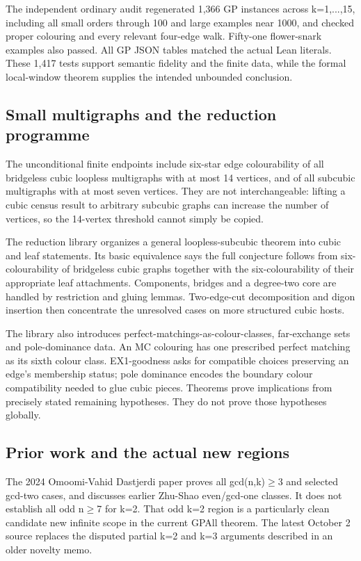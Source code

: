\documentclass[11pt,a4paper]{article}
\begin{document}
The independent ordinary audit regenerated 1,366 GP instances across k=1,...,15, including all small orders through 100 and large examples near 1000, and checked proper colouring and every relevant four-edge walk. Fifty-one flower-snark examples also passed. All GP JSON tables matched the actual Lean literals. These 1,417 tests support semantic fidelity and the finite data, while the formal local-window theorem supplies the intended unbounded conclusion.

\subsection{Small multigraphs and the reduction programme}
The unconditional finite endpoints include six-star edge colourability of all bridgeless cubic loopless multigraphs with at most 14 vertices, and of all subcubic multigraphs with at most seven vertices. They are not interchangeable: lifting a cubic census result to arbitrary subcubic graphs can increase the number of vertices, so the 14-vertex threshold cannot simply be copied.

The reduction library organizes a general loopless-subcubic theorem into cubic and leaf statements. Its basic equivalence says the full conjecture follows from six-colourability of bridgeless cubic graphs together with the six-colourability of their appropriate leaf attachments. Components, bridges and a degree-two core are handled by restriction and gluing lemmas. Two-edge-cut decomposition and digon insertion then concentrate the unresolved cases on more structured cubic hosts.

The library also introduces perfect-matchings-as-colour-classes, far-exchange sets and pole-dominance data. An MC colouring has one prescribed perfect matching as its sixth colour class. EX1-goodness asks for compatible choices preserving an edge's membership status; pole dominance encodes the boundary colour compatibility needed to glue cubic pieces. Theorems prove implications from precisely stated remaining hypotheses. They do not prove those hypotheses globally.

\subsection{Prior work and the actual new regions}
The 2024 Omoomi-Vahid Dastjerdi paper proves all gcd(n,k)\ensuremath{\geq}3 and selected gcd-two cases, and discusses earlier Zhu-Shao even/gcd-one classes. It does not establish all odd n\ensuremath{\geq}7 for k=2. That odd k=2 region is a particularly clean candidate new infinite scope in the current GPAll theorem. The latest October 2 source replaces the disputed partial k=2 and k=3 arguments described in an older novelty memo.
\end{document}
